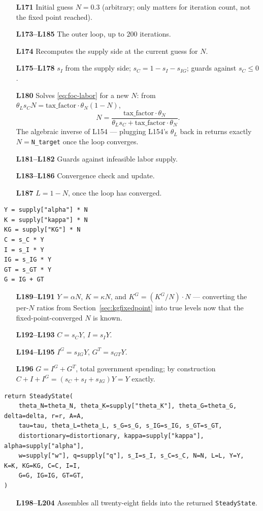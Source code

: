 \documentclass[11pt]{article}
\newcommand{\eq}[1]{\begin{equation}#1\end{equation}}
\begin{document}
\begin{itemize}
\item[\textbf{L171}] Initial guess $N=0.3$ (arbitrary; only matters for
iteration count, not the fixed point reached).
\item[\textbf{L173--L185}] The outer loop, up to $200$ iterations.
\item[\textbf{L174}] Recomputes the supply side at the current guess for
$N$.
\item[\textbf{L175--L178}] $s_I$ from the supply side; $s_C=1-s_I-s_{IG}$;
guards against $s_C\le0$.
\item[\textbf{L180}] Solves \eqref{eq:foc-labor} for a new $N$: from
$\theta_L s_C N=\text{tax\_factor}\cdot\theta_N(1-N)$,
\eq{ N=\frac{\text{tax\_factor}\cdot\theta_N}{\theta_L s_C+\text{tax\_factor}\cdot\theta_N}. }
The algebraic inverse of L154 --- plugging L154's $\theta_L$ back in
returns exactly $N=$\texttt{N\_target} once the loop converges.
\item[\textbf{L181--L182}] Guards against infeasible labor supply.
\item[\textbf{L183--L186}] Convergence check and update.
\item[\textbf{L187}] $L=1-N$, once the loop has converged.
\end{itemize}

\begin{lstlisting}[firstnumber=189]
Y = supply["alpha"] * N
K = supply["kappa"] * N
KG = supply["KG"] * N
C = s_C * Y
I = s_I * Y
IG = s_IG * Y
GT = s_GT * Y
G = IG + GT
\end{lstlisting}
\begin{itemize}
\item[\textbf{L189--L191}] $Y=\alpha N$, $K=\kappa N$, and $K^G=(K^G/N)\cdot
N$ --- converting the per-$N$ ratios from Section~\ref{sec:kgfixedpoint}
into true levels now that the fixed-point-converged $N$ is known.
\item[\textbf{L192--L193}] $C=s_C Y$, $I=s_I Y$.
\item[\textbf{L194--L195}] $I^G=s_{IG}Y$, $G^T=s_{GT}Y$.
\item[\textbf{L196}] $G=I^G+G^T$, total government spending; by
construction $C+I+I^G=(s_C+s_I+s_{IG})Y=Y$ exactly.
\end{itemize}

\begin{lstlisting}[firstnumber=198]
return SteadyState(
    theta_N=theta_N, theta_K=supply["theta_K"], theta_G=theta_G, delta=delta, r=r, A=A,
    tau=tau, theta_L=theta_L, s_G=s_G, s_IG=s_IG, s_GT=s_GT,
    distortionary=distortionary, kappa=supply["kappa"], alpha=supply["alpha"],
    w=supply["w"], q=supply["q"], s_I=s_I, s_C=s_C, N=N, L=L, Y=Y, K=K, KG=KG, C=C, I=I,
    G=G, IG=IG, GT=GT,
)
\end{lstlisting}
\begin{itemize}
\item[\textbf{L198--L204}] Assembles all twenty-eight fields into the
returned \texttt{SteadyState}.
\end{itemize}
\end{document}
